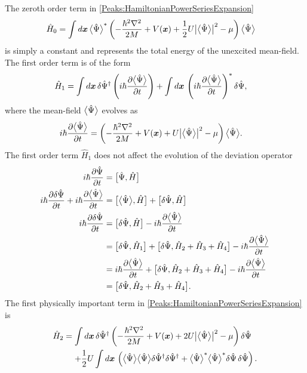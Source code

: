 The zeroth order term in \eqref{Peaks:HamiltonianPowerSeriesExpansion}
\begin{align}
    \hat{H}_0 &= \int d \bm{x}\, {\big<\hat{\Psi}\big>}^* \left( -\frac{\hbar^2 \nabla^2}{2M} + V(\bm{x}) + \frac{1}{2} U \big|{\big<\hat{\Psi}\big>}\big|^2 - \mu \right) {\big<\hat{\Psi}\big>}
\end{align}
is simply a constant and represents the total energy of the unexcited mean-field. The first order term is of the form
\begin{align}
    \hat{H}_1 &= \int d \bm{x}\, \delta \hat{\Psi}^\dagger \left(i \hbar \frac{\partial {\ensuremath{\big<\hat{\Psi}\big>}}}{\partial t} \right)  + \int d \bm{x}\, \left(i \hbar \frac{\partial {\ensuremath{\big<\hat{\Psi}\big>}}}{\partial t} \right)^* \delta \hat{\Psi},
\end{align}
where the mean-field ${\big<\hat{\Psi}\big>}$ evolves as
\begin{align}
    i \hbar \frac{\partial {\ensuremath{\big<\hat{\Psi}\big>}}}{\partial t} &= \left(-\frac{\hbar^2 \nabla^2}{2 M} + V(\bm{x}) + U \big| {\big<\hat{\Psi}\big>}\big|^2 - \mu \right) {\big<\hat{\Psi}\big>}.
\end{align}
The first order term $\hat{H}_1$ does not affect the evolution of the deviation operator
\begin{align}
    i \hbar \frac{\partial \hat{\Psi}}{\partial t} &= \big[\hat{\Psi}, \hat{H}\big]\\
    i \hbar \frac{\partial \delta{\hat{\Psi}}}{\partial t} + i \hbar \frac{\partial {\ensuremath{\big<\hat{\Psi}\big>}}}{\partial t} &= \big[{\big<\hat{\Psi}\big>}, \hat{H}\big] + \big[\delta\hat{\Psi}, \hat{H}\big]\\
    i \hbar \frac{\partial \delta \hat{\Psi}}{\partial t} &= \big[\delta \hat{\Psi}, \hat{H}\big] - i \hbar \frac{\partial {\ensuremath{\big<\hat{\Psi}\big>}}}{\partial t}\\
    &= \big[\delta \hat{\Psi}, \hat{H}_1\big] + \big[\delta \hat{\Psi}, \hat{H}_2 + \hat{H}_3 + \hat{H}_4\big] - i \hbar \frac{\partial {\ensuremath{\big<\hat{\Psi}\big>}}}{\partial t}\\
    &= i \hbar \frac{\partial {\ensuremath{\big<\hat{\Psi}\big>}}}{\partial t}+ \big[\delta \hat{\Psi}, \hat{H}_2 + \hat{H}_3 + \hat{H}_4\big] - i \hbar \frac{\partial {\ensuremath{\big<\hat{\Psi}\big>}}}{\partial t}\\
    &= \big[\delta \hat{\Psi}, \hat{H}_2 + \hat{H}_3 + \hat{H}_4\big].
\end{align}
The first physically important term in \eqref{Peaks:HamiltonianPowerSeriesExpansion} is
\begin{align}
    \begin{split}
        \hat{H}_2 &= \int d \bm{x}\, \delta \hat{\Psi}^\dagger \left(-\frac{\hbar^2 \nabla^2}{2 M} + V(\bm{x}) + 2 U\big|\mean{\hat{\Psi}}\big|^2 -\mu \right)\delta\hat{\Psi}\\
         &\relphantom{=} + \frac{1}{2} U\int d \bm{x}\, \left(\mean{\hat{\Psi}}\mean{\hat{\Psi}} \delta \hat{\Psi}^\dagger\delta \hat{\Psi}^\dagger  +  \mean{\hat{\Psi}}^*\mean{\hat{\Psi}}^* \delta \hat{\Psi} \,\delta \hat{\Psi}\right).
    \end{split}
\end{align}
